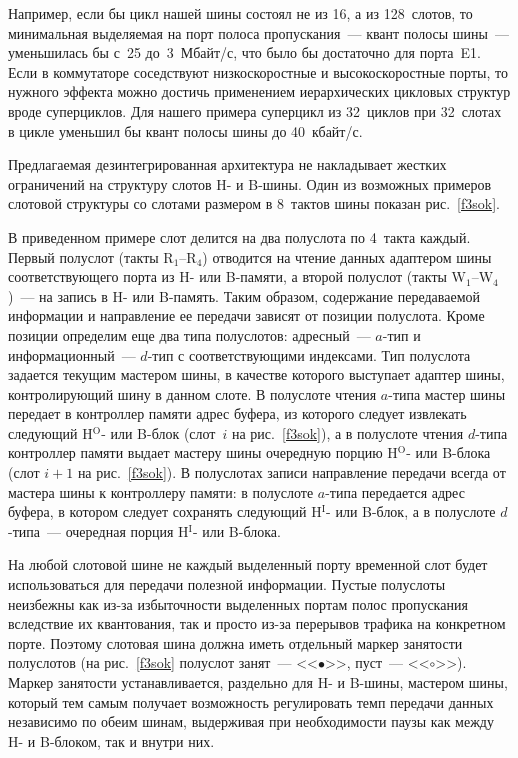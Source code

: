 \begin{multicols}{2}
Например, если бы цикл нашей шины состоял не из
16, а из 128~слотов, то минимальная выделяемая на порт полоса пропускания~--- квант полосы
шины~--- уменьшилась бы с~25 до~3~Мбайт/с, что было бы достаточно для порта~E1.
Если в коммутаторе соседствуют низкоскоростные и высокоскоростные порты, то нужного
эффекта можно достичь применением иерархических цикловых структур вроде суперциклов.
Для нашего примера суперцикл из 32~циклов при 32~слотах в цикле уменьшил бы квант
полосы шины до 40~кбайт/с.

    Предлагаемая дезинтегрированная архитектура не накладывает жестких ограничений на
структуру слотов H- и B-шины. Один из возможных примеров слотовой структуры со слотами
размером в 8~тактов шины показан рис.~\ref{f3sok}.

    В приведенном примере слот делится на два полуслота по 4~такта каждый. Первый
полуслот (такты R$_1$--R$_4$) отводится на чтение данных адап\-те\-ром шины соответствующего
порта из H- или B-памяти, а второй полуслот (такты W$_1$--W$_4$)~--- на запись в H- или
B-память. Таким образом, содержание передаваемой информации и направление ее передачи
зависят от позиции полуслота. Кроме позиции определим еще два типа полуслотов:
    адресный~--- $a$-тип и информационный~--- $d$-тип с соответствующими индексами. Тип
полуслота задается текущим мастером шины, в качестве которого выступает адаптер шины,
контролирующий шину в данном слоте. В полуслоте чтения $a$-типа  мастер шины передает в
контроллер памяти адрес буфера, из которого следует извлекать следующий H$^{\mathrm{O}}$- или B-блок
(слот~$i$ на рис.~\ref{f3sok}), а в полуслоте  чтения $d$-типа  контроллер памяти выдает
мастеру шины очередную порцию H$^{\mathrm{O}}$- или B-блока (слот $i+1$ на рис.~\ref{f3sok}). В
полуслотах записи направление передачи всегда от мастера шины к контроллеру памяти: в
полуслоте $a$-типа  передается адрес буфера, в котором следует сохранять следующий H$^{\mathrm{I}}$-
или B-блок, а в полуслоте $d$-типа~--- очередная порция H$^{\mathrm{I}}$- или B-блока.

    На любой слотовой шине не каждый выделенный порту временной слот будет
использоваться для передачи полезной информации. Пустые полуслоты неизбежны как из-за
избыточности выделенных портам полос пропускания вследствие их квантования, так и просто
из-за перерывов трафика на конкретном порте. Поэтому слотовая шина должна иметь
отдельный маркер занятости полуслотов (на рис.~\ref{f3sok} полуслот занят~--- <<$\bullet$>>,
пуст~--- <<$\circ$>>). Маркер занятости устанавливается, раздельно для H- и B-шины, мастером
шины, который тем самым получает возможность регулировать темп передачи данных
независимо по обеим шинам, выдерживая при необходимости паузы как между H- и B-блоком,
так и внутри них.


\end{multicols}
